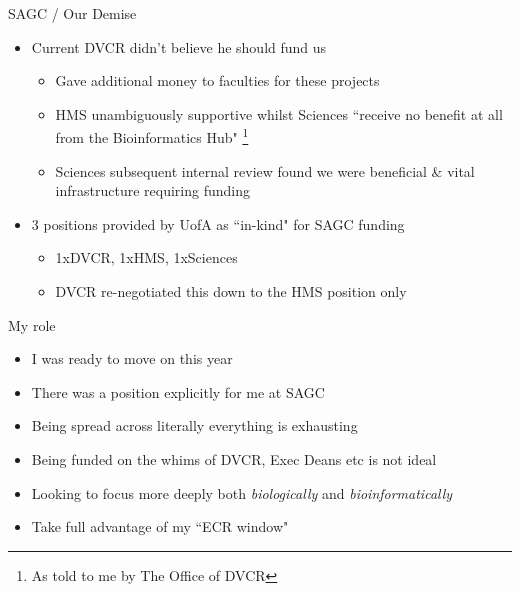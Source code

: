 \documentclass[11pt]{beamer}
\newcommand\blfootnote[1]{%
  \begingroup
  \renewcommand\thefootnote{}\footnote{#1}%
  \addtocounter{footnote}{-1}%
  \endgroup
}
\begin{document}
\begin{frame}{SAGC / Our Demise}

	\begin{itemize}
		\item Current DVCR didn't believe he should fund us
		\begin{itemize}
			\item Gave additional money to faculties for these projects
			\item HMS unambiguously supportive whilst Sciences ``receive no benefit at all from the Bioinformatics Hub"\blfootnote{As told to me by The Office of DVCR}
			\item Sciences subsequent internal review found we were beneficial \& vital infrastructure requiring funding
		\end{itemize}
		\item 3 positions provided by UofA as ``in-kind" for SAGC funding 
		\begin{itemize}
			\item 1xDVCR, 1xHMS, 1xSciences
			\item DVCR re-negotiated this down to the HMS position only\\[5mm]
		\end{itemize}
	\end{itemize}

\end{frame}

\begin{frame}{My role}

	\begin{itemize}
		\item I was ready to move on this year
		\item There was a position explicitly for me at SAGC
		\item Being spread across literally everything is exhausting
		\item Being funded on the whims of DVCR, Exec Deans etc is not ideal
		\item Looking to focus more deeply both \textit{biologically} and \textit{bioinformatically}
		\item Take full advantage of my ``ECR window"
	\end{itemize}

\end{frame}
\end{document}
